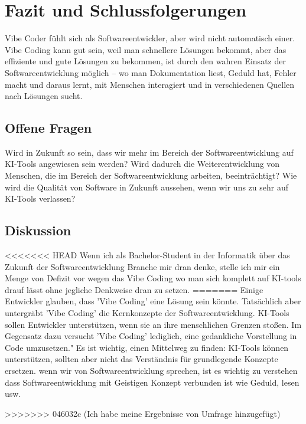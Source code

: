 \documentclass[paper=a4,fontsize=12pt,ngerman]{scrartcl}
\begin{document}
\clearpage
\section{Fazit und Schlussfolgerungen}
Vibe Coder fühlt sich als Softwareentwickler, aber wird nicht automatisch einer. 
Vibe Coding kann gut sein, weil man schnellere Lösungen bekommt, aber das effiziente und gute Lösungen zu bekommen, ist durch den wahren Einsatz der Softwareentwicklung möglich – wo man Dokumentation liest, Geduld hat, Fehler macht und daraus lernt, mit Menschen interagiert und in verschiedenen Quellen nach Lösungen sucht.

\subsection{Offene Fragen}
Wird in Zukunft so sein, dass wir mehr im Bereich der Softwareentwicklung auf KI-Tools angewiesen sein werden?  
Wird dadurch die Weiterentwicklung von Menschen, die im Bereich der Softwareentwicklung arbeiten, beeinträchtigt?  
Wie wird die Qualität von Software in Zukunft aussehen, wenn wir uns zu sehr auf KI-Tools verlassen?

\subsection{Diskussion}
<<<<<<< HEAD
Wenn ich als Bachelor-Student in der Informatik über das Zukunft der Softwareentwicklung Branche mir dran 
denke, stelle ich mir ein Menge von Defizit vor wegen das Vibe Coding 
wo man sich komplett auf KI-tools drauf lässt ohne jegliche Denkweise dran zu setzen.
=======
Einige Entwickler glauben, dass 'Vibe Coding' 
eine Lösung sein könnte. 
Tatsächlich aber untergräbt 'Vibe Coding' die Kernkonzepte der Softwareentwicklung. 
KI-Tools sollen Entwickler unterstützen, wenn sie an ihre menschlichen Grenzen stoßen. 
Im Gegensatz dazu versucht 'Vibe Coding' lediglich, eine gedankliche Vorstellung in Code umzusetzen."
Es ist wichtig, einen Mittelweg zu finden: KI-Tools können unterstützen, sollten aber nicht das Verständnis für grundlegende Konzepte ersetzen.
wenn wir von Softwareentwicklung sprechen, ist es wichtig zu verstehen dass Softwareentwicklung mit Geistigen Konzept verbunden ist wie Geduld, lesen usw.


>>>>>>> 046032c (Ich habe meine Ergebnisse von Umfrage hinzugefügt)
\clearpage
\renewcommand\refname{Literaturverzeichnis}


\end{document}
